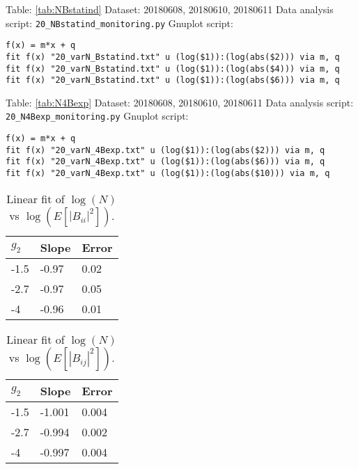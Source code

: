 \documentclass[12pt,a4paper]{article}
\begin{document}
\mbox{}\newline
Table: \ref{tab:NBstatind} \newline
Dataset: 20180608, 20180610, 20180611\newline
Data analysis script: \verb|20_NBstatind_monitoring.py|\newline
Gnuplot script:
\begin{lstlisting}
f(x) = m*x + q
fit f(x) "20_varN_Bstatind.txt" u (log($1)):(log(abs($2))) via m, q
fit f(x) "20_varN_Bstatind.txt" u (log($1)):(log(abs($4))) via m, q
fit f(x) "20_varN_Bstatind.txt" u (log($1)):(log(abs($6))) via m, q
\end{lstlisting}
\mbox{}\newline
Table: \ref{tab:N4Bexp} \newline
Dataset: 20180608, 20180610, 20180611\newline
Data analysis script: \verb|20_N4Bexp_monitoring.py|\newline
Gnuplot script:
\begin{lstlisting}
f(x) = m*x + q
fit f(x) "20_varN_4Bexp.txt" u (log($1)):(log(abs($2))) via m, q
fit f(x) "20_varN_4Bexp.txt" u (log($1)):(log(abs($6))) via m, q
fit f(x) "20_varN_4Bexp.txt" u (log($1)):(log(abs($10))) via m, q
\end{lstlisting}
\mbox{}\newline
\begin{table}[hp]
\centering
\begin{tabular}{|l|l|l|}
\hline
$g_2$ & Slope & Error \\ \hline
-1.5 & -0.97 & 0.02 \\ \hline
-2.7 & -0.97 & 0.05 \\ \hline
-4 & -0.96 & 0.01 \\ \hline
\end{tabular}
\caption{Linear fit of $\log(N)$ vs $\log(E[ |B_{ii}|^2 ])$.}
\label{tab:NB2iiexp}
\end{table}
\begin{table}[hp]
\centering
\begin{tabular}{|l|l|l|}
\hline
$g_2$ & Slope & Error \\ \hline
-1.5 & -1.001 & 0.004 \\ \hline
-2.7 & -0.994 & 0.002 \\ \hline
-4 & -0.997 & 0.004 \\ \hline
\end{tabular}
\caption{Linear fit of $\log(N)$ vs $\log(E[ |B_{ij}|^2 ])$.}
\label{tab:NB2ijexp}
\end{table}
\end{document}
